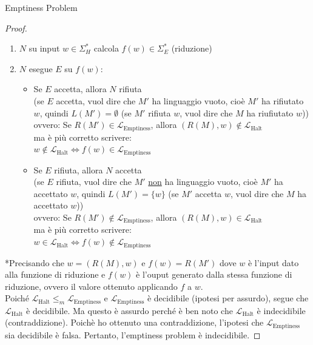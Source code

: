 \documentclass{article}  %
\theoremstyle{definition}
\begin{document}
\begin{theorem}{Emptiness Problem}
\begin{proof}
    \begin{enumerate}
      \item $N$ su input $w \in \Sigma_H^*$ calcola $f(w) \in \Sigma_E^*$ (riduzione)
      \item $N$ esegue $E$ su $f(w)$:
      \begin{itemize}
        \item Se $E$ accetta, allora $N$ rifiuta \\
        (se $E$ accetta, vuol dire che $M'$ ha linguaggio vuoto, cioè $M'$ ha rifiutato $w$, quindi $L(M')=\emptyset$ (se $M'$ rifiuta $w$, vuol
        dire che $M$ ha riufiutato $w$)) \\
        ovvero: Se $R(M') \in \mathcal{L}_{\text{Emptiness}}$, allora $(R(M),w) \notin \mathcal{L}_{\text{Halt}}$ \\
        ma è più corretto scrivere: \\
        $w \notin \mathcal{L}_{\text{Halt}} \iff  f(w) \in \mathcal{L}_{\text{Emptiness}}$
        \item Se $E$ rifiuta, allora $N$ accetta \\
        (se $E$ rifiuta, vuol dire che $M'$ \underline{non} ha linguaggio vuoto, cioè $M'$ ha accettato $w$, quindi $L(M')=\{w\}$ (se $M'$ accetta $w$, vuol
        dire che $M$ ha accettato $w$)) \\ 
        ovvero: Se $R(M') \notin \mathcal{L}_{\text{Emptiness}}$, allora $(R(M),w) \in \mathcal{L}_{\text{Halt}}$ \\
        ma è più corretto scrivere: \\
        $w \in \mathcal{L}_{\text{Halt}} \iff f(w) \notin \mathcal{L}_{\text{Emptiness}}$
      \end{itemize} 
    \end{enumerate}
    *Precisando che $w=(R(M),w)$ e $f(w)=R(M')$
    dove $w$ è l'input dato alla funzione di riduzione e $f(w)$ è l'ouput generato dalla stessa funzione di riduzione, ovvero il valore ottenuto applicando $f$ a $w$. \\

    Poiché $\mathcal{L}_{\text{Halt}} \leq_m \mathcal{L}_{\text{Emptiness}}$ e $\mathcal{L}_{\text{Emptiness}}$ è decidibile (ipotesi per assurdo), segue 
    che $\mathcal{L}_{\text{Halt}}$ è decidibile.
    Ma questo è assurdo perché è ben noto che $\mathcal{L}_{\text{Halt}}$ è indecidibile (contraddizione). Poichè ho ottenuto una contraddizione, l'ipotesi che 
    $\mathcal{L}_{\text{Emptiness}}$ sia decidibile è falsa. Pertanto, l'emptiness problem è indecidibile.
  \end{proof}
\end{theorem}
\end{document}
